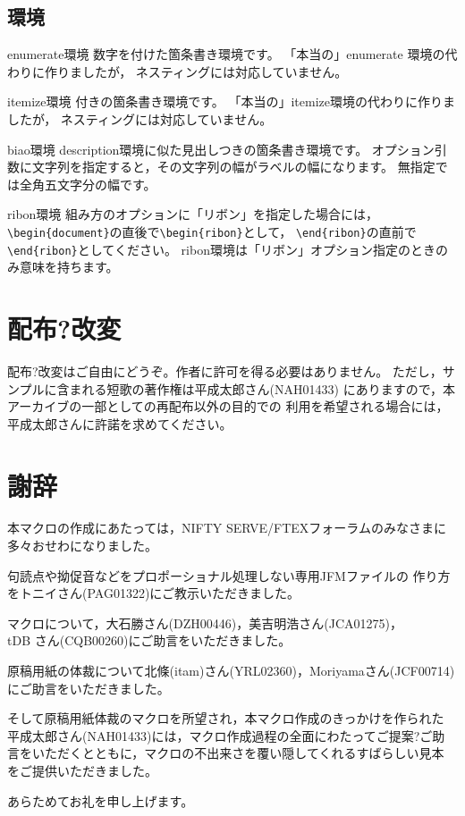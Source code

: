 \documentclass{jarticle}
\begin{document}
\subsection{環境}

\begin{biao}[　　　　　　　　]
\item[enumerate環境]数字を付けた箇条書き環境です。
「本当の」enumerate 環境の代わりに作りましたが，
ネスティングには対応していません。
\item[itemize環境]\makebox[1zw][c]{\textbullet}付きの箇条書き環境です。
「本当の」itemize環境の代わりに作りましたが，
ネスティングには対応していません。
\item[biao環境]description環境に似た見出しつきの箇条書き環境です。
オプション引数に文字列を指定すると，その文字列の幅がラベルの幅になります。
無指定では全角五文字分の幅です。
\item[ribon環境]組み方のオプションに「リボン」を指定した場合には，
\verb+\begin{document}+の直後で\verb+\begin{ribon}+として，
\verb+\end{ribon}+の直前で\verb+\end{ribon}+としてください。
ribon環境は「リボン」オプション指定のときのみ意味を持ちます。
\end{biao}

\section{配布?改変}
配布?改変はご自由にどうぞ。作者に許可を得る必要はありません。
ただし，サンプルに含まれる短歌の著作権は平成太郎さん(NAH01433)
にありますので，本アーカイブの一部としての再配布以外の目的での
利用を希望される場合には，平成太郎さんに許諾を求めてください。

\section{謝辞}

本マクロの作成にあたっては，NIFTY SERVE/FTEXフォーラムのみなさまに
多々おせわになりました。

句読点や拗促音などをプロポーショナル処理しない専用JFMファイルの
作り方をトニイさん(PAG01322)にご教示いただきました。

マクロについて，大石勝さん(DZH00446)，美吉明浩さん(JCA01275)，\\
tDB さん(CQB00260)にご助言をいただきました。

原稿用紙の体裁について北條(itam)さん(YRL02360)，Moriyamaさん(JCF00714)
にご助言をいただきました。

そして原稿用紙体裁のマクロを所望され，本マクロ作成のきっかけを作られた
平成太郎さん(NAH01433)には，マクロ作成過程の全面にわたってご提案?ご助
言をいただくとともに，マクロの不出来さを覆い隠してくれるすばらしい見本
をご提供いただきました。

あらためてお礼を申し上げます。

\vskip10mm

\end{document}
